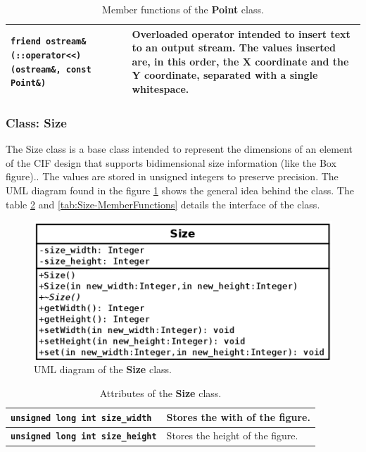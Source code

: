 \documentclass[11pt,twoside,openany,x11names,svgnames]{memoir}
\begin{document}
\begin{table}[h]
\begin{tabular}{| >{\bfseries}p{9.2cm} | p{6.3cm} |}
	\hline
	
	\texttt{friend ostream\& (::operator<<) (ostream\&, const Point\&)} & Overloaded operator intended to insert text to an output stream. The values inserted are, in this order, the X coordinate and the Y coordinate, separated with a single whitespace. \\
	
	\hline
\end{tabular}
\caption{Member functions of the \textbf{Point} class.}
\label{tab:Point-MemberFunctions}
\end{table}

\clearpage 

\subsubsection{Class: Size}\label{Class-Size}

The Size class is a base class intended to represent the dimensions of an element of the CIF design that supports bidimensional size information (like the Box figure).. The values are stored in unsigned integers to preserve precision. The UML diagram found in the figure \ref{fig:class-size} shows the general idea behind the class. The table \ref{tab:Size-Attributes} and \ref{tab:Size-MemberFunctions} details the interface of the class.

\begin{figure}
	\centering
	\includegraphics[scale=0.4, clip=true, trim= 0pt 0pt 0pt 0pt]{images/chapter03-image13}
	\caption{UML diagram of the \textbf{Size} class.}
	\label{fig:class-size}
\end{figure}

\begin{table}[h]\footnotesize
\centering
\begin{tabular}{| >{\bfseries}p{5.5cm} | p{10cm} |}
	\hline
	
	\texttt{unsigned long int size\_width} & Stores the with of the figure. \\
	
	\hline
	
	\texttt{unsigned long int size\_height} & Stores the height of the figure. \\
	
	\hline
\end{tabular}
\caption{Attributes of the \textbf{Size} class.}
\label{tab:Size-Attributes}
\end{table}
\end{document}
